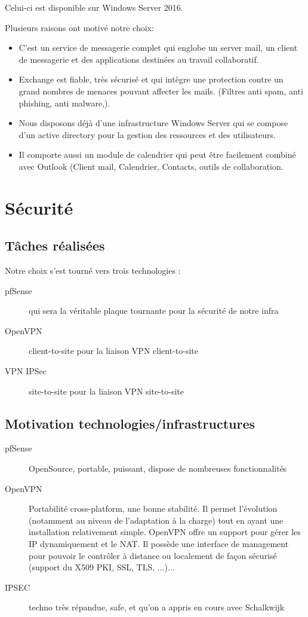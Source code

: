 \documentclass{article}
\begin{document}
Celui-ci est disponible sur Windows Server 2016.

Plusieurs raisons ont motivé notre choix:

\begin{itemize}
\item C’est un service de messagerie complet qui englobe un server mail, un client de messagerie et des applications destinées au travail collaboratif.

\item Exchange est fiable, très sécurisé et qui intègre une protection contre un grand nombres de menaces pouvant affecter les mails. (Filtres anti spam, anti phishing, anti malware,).

\item Nous disposons déjà d’une infrastructure Windows Server qui se compose d’un active directory pour la gestion des ressources et des utilisateurs.

\item Il comporte aussi un module de calendrier qui peut être facilement combiné avec Outlook (Client mail, Calendrier, Contacts, outils de collaboration.
    
\end{itemize}  

 
\section{Sécurité}
    \subsection{Tâches réalisées} 
    Notre choix s'est tourné vers trois technologies : 
    \begin{description}
        \item[pfSense]  qui sera la véritable plaque tournante pour la sécurité de notre infra
        \item[OpenVPN] client-to-site pour la liaison VPN client-to-site
        \item[VPN IPSec] site-to-site pour la liaison VPN site-to-site 
    \end{description}
    \subsection{Motivation technologies/infrastructures} 
    \begin{description}
        \item[pfSense] OpenSource, portable, puissant, dispose de nombreuses fonctionnalités
        \item[OpenVPN] Portabilité cross-platform, une bonne stabilité. Il permet l'évolution (notamment au niveau de l'adaptation à la charge) tout en ayant une installation relativement simple. 
        OpenVPN offre un support pour gérer les IP dynamiquement et le NAT. Il possède une interface de management pour pouvoir le contrôler à distance ou localement de façon sécurisé (support du X509 PKI, SSL, TLS, ...)...
        \item[IPSEC] techno très répandue, safe, et qu'on a appris en cours avec Schalkwijk
    \end{description}
\end{document}
